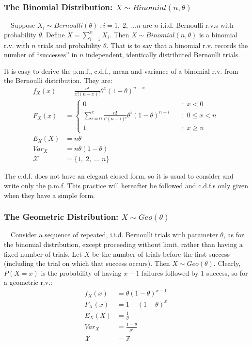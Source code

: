 \documentclass[12pt,a4paper]{article}
\begin{document}
\subsubsection{The Binomial Distribution: $X \sim Binomial(n,\theta)$}

$\quad$Suppose $X_i \sim Bernoulli(\theta) \; : i = 1,\; 2,\; ... n$ are $n$ i.i.d. Bernoulli r.v.s with probability $\theta$. Define $X = \sum_{i=1}^n X_i$. Then $X \sim Binomial(n, \theta)$ is a binomial r.v. with $n$ trials and probability $\theta$. That is to say that a binomial r.v. records the number of ``successes'' in $n$ independent, identically distributed Bernoulli trials.

It is easy to derive the p.m.f., c.d.f., mean and variance of a binomial r.v. from the Bernoulli distribution. They are:
\begin{align*}
f_X(x) &= \frac{n!}{x! (n - x)!} \theta^x (1 - \theta)^{n - x}\\
F_X(x) &= \left\{ \begin{array}{cl} 0 \quad & : \; x < 0\\ \sum\limits_{i=0}^{x} \frac{n!}{i! (n - i)!} \theta^i (1 - \theta)^{n - i} \quad & : \; 0 \leq x < n\\ 1 \quad & : \; x \geq n \end{array} \right.\\
E_{X}(X) &= n\theta\\
Var_{X} &= n\theta(1-\theta)\\
\mathcal{X} &= \{1,\; 2,\; ... \; n\}
\end{align*}

The c.d.f. does not have an elegant closed form, so it is usual to consider and write only the p.m.f. This practice will hereafter be followed and c.d.f.s only given when they have a simple form.

\subsubsection{The Geometric Distribution: $X \sim Geo(\theta)$}

$\quad$Consider a sequence of repeated, i.i.d. Bernoulli trials with parameter $\theta$, as for the binomial distribution, except proceeding without limit, rather than having a fixed number of trials. Let $X$ be the number of trials before the first success (including the trial on which that success occurs). Then $X \sim Geo(\theta)$. Clearly, $P(X=x)$ is the probability of having $x-1$ failures followed by 1 success, so for a geometric r.v.:
\begin{align*}
f_X(x) &= \theta (1-\theta)^{x-1}\\
F_{X}(x) &= 1 - (1-\theta)^x\\
E_{X}(X) &= \frac{1}{\theta}\\
Var_{X} &= \frac{1-\theta}{\theta^2}\\
\mathcal{X} &= \mathbb{Z}^+
\end{align*}
\end{document}
